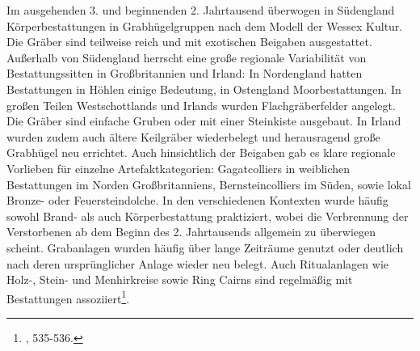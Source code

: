 \documentclass[openany,twoside,twocolumn]{book}
\let\rmarkdownfootnote\footnote%
\def\footnote{\protect\rmarkdownfootnote}
\begin{document}
Im ausgehenden 3. und beginnenden 2. Jahrtausend überwogen in Südengland
Körperbestattungen in Grabhügelgruppen nach dem Modell der Wessex
Kultur. Die Gräber sind teilweise reich und mit exotischen Beigaben
ausgestattet. Außerhalb von Südengland herrscht eine große regionale
Variabilität von Bestattungssitten in Großbritannien und Irland: In
Nordengland hatten Bestattungen in Höhlen einige Bedeutung, in
Ostengland Moorbestattungen. In großen Teilen Westschottlands und
Irlands wurden Flachgräberfelder angelegt. Die Gräber sind einfache
Gruben oder mit einer Steinkiste ausgebaut. In Irland wurden zudem auch
ältere Keilgräber wiederbelegt und herausragend große Grabhügel neu
errichtet. Auch hinsichtlich der Beigaben gab es klare regionale
Vorlieben für einzelne Artefaktkategorien: Gagatcolliers in weiblichen
Bestattungen im Norden Großbritanniens, Bernsteincolliers im Süden,
sowie lokal Bronze- oder Feuersteindolche. In den verschiedenen
Kontexten wurde häufig sowohl Brand- als auch Körperbestattung
praktiziert, wobei die Verbrennung der Verstorbenen ab dem Beginn des 2.
Jahrtausends allgemein zu überwiegen scheint. Grabanlagen wurden häufig
über lange Zeiträume genutzt oder deutlich nach deren ursprünglicher
Anlage wieder neu belegt. Auch Ritualanlagen wie Holz-, Stein- und
Menhirkreise sowie Ring Cairns sind regelmäßig mit Bestattungen
assoziiert\footnote{\textcite{roberts_britain_2013}, 535-536.}.
\end{document}
